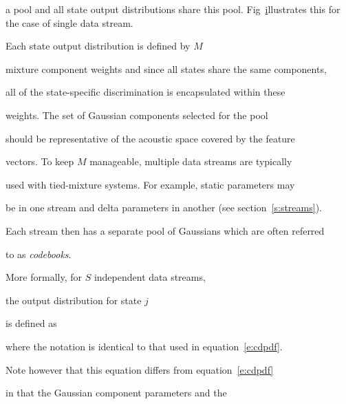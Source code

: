 a pool and all state output distributions share this pool.  Fig~\href{f:tmixeg}


illustrates this for the case of single data stream.  







Each state output distribution is defined by $M$


mixture component weights and since all states share the same components,


all of the state-specific discrimination  is encapsulated within these


weights.  The set of Gaussian components selected for the pool


should be representative of the acoustic space covered by the feature


vectors.  To keep $M$ manageable, multiple data streams are typically


used with tied-mixture systems.  For example, static parameters may


be in one stream and delta parameters in another (see section~\ref{s:streams}).


Each stream then has a separate pool of Gaussians which are often referred


to as \textit{codebooks}.





More formally, for $S$ independent data streams, 


the output distribution for state $j$


is defined as 







where the notation is identical to that used in equation~\ref{e:cdpdf}.


Note however that this equation differs from equation~\ref{e:cdpdf}


in that the Gaussian component parameters and the 


